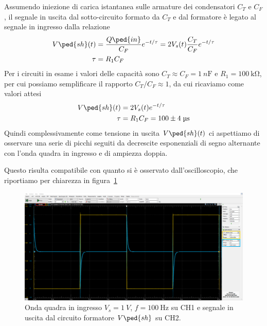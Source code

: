 \documentclass[10pt, a4paper, italian]{article}
\begin{document}
Assumendo iniezione di carica istantanea sulle armature dei condensatori $C_T$
e $C_F$, il segnale in uscita dal sotto-circuito formato da $C_T$ e dal
formatore è legato al segnale in ingresso dalla relazione
\begin{align}\label{eq:Vsh}
V\ped{sh}(t) &= \frac{Q\ped{in}}{C_F} e^{-t/\tau} =
2V_s(t) \frac{C_T}{C_F} e^{-t/\tau} \\
\tau &= R_1 C_F
\end{align}
Per i circuiti in esame i valori delle capacità sono
$C_T \approx C_F = \SI{1}{n\F}$ e $R_1 = \SI{100}{\kilo\ohm}$,
per cui possiamo semplificare il rapporto $C_T/C_F \approx 1$, da cui
ricaviamo come valori attesi
\begin{align*}
V\ped{sh}(t) &= 2V_s(t) e^{-t/\tau} \\
\tau &= R_1 C_F = 100 \pm 4 \; \si{\micro\s}
\end{align*}
Quindi complessivamente come tensione in uscita $V\ped{sh} (t)$ ci aspettiamo
di osservare una serie di picchi seguiti da decrescite esponenziali di segno
alternante con l'onda quadra in ingresso e di ampiezza doppia.

Questo risulta compatibile con quanto si è osservato dall'oscilloscopio, che
riportiamo per chiarezza in figura~\ref{fig: shaper}
\begin{figure}[htbp]
    \centering
	\includegraphics[scale=0.335]{shaper}
    \caption{Onda quadra in ingresso $V_s = \SI{1}{V}$, $f = \SI{100}{\Hz}$
    su CH1 e segnale in uscita dal circuito formatore $V\ped{sh}$ su CH2.
    \label{fig: shaper}}
\end{figure}
\end{document}

